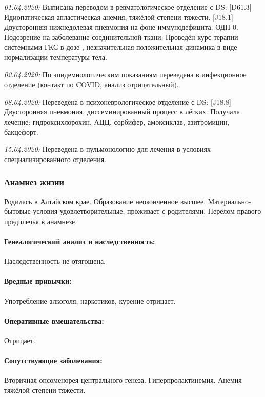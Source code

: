\documentclass[a4paper,14pt]{extarticle}
\newcommand{\mg}{мг}
\newcommand{\pdate}[1]{\emph{#1:} }
\newcommand{\DS}[2]{[#2] #1}
\begin{document}
\pdate{01.04.2020} Выписана переводом в ревматологическое отделение с DS: \DS{Идиопатическая апластическая анемия, тяжёлой степени тяжести}{D61.3}. \DS{Двусторонняя нижнедолевая пневмония на фоне иммунодефицита, ОДН 0}{J18.1}. Подозрение на заболевание соединительной ткани.
Проведён курс терапии системными ГКС в дозе \numprint[\mg]{35}, незначительная положительная динамика в виде нормализации температуры тела.

\pdate{02.04.2020} По эпидемиологическим показаниям переведена в инфекционное отделение (контакт по COVID, анализ отрицательный).

\pdate{08.04.2020} Переведена в психоневрологическое отделение с DS: \DS{Двусторонняя пневмония, диссеминированный процесс в лёгких}{J18.8}.
Получала лечение: гидроксихлорохин, АЦЦ, сорбифер, амоксиклав, азитромицин, бакцефорт.

\pdate{15.04.2020} Переведена в пульмонологию для лечения в условиях специализированного отделения.

\subsubsection*{Анамнез жизни}

Родилась в Алтайском крае.
Образование неоконченное высшее.
Материально\hyp{}бытовые условия удовлетворительные, проживает с родителями.
Перелом правого предплечья в анамнезе.

\paragraph{Генеалогический анализ и наследственность:} Наследственность не отягощена.

\paragraph{Вредные привычки:} Употребление алкоголя, наркотиков, курение отрицает.

\paragraph{Оперативные вмешательства:} Отрицает.

\paragraph{Сопутствующие заболевания:} Вторичная опсоменорея центрального генеза. Гиперпролактинемия. Анемия тяжёлой степени тяжести.
\end{document}
